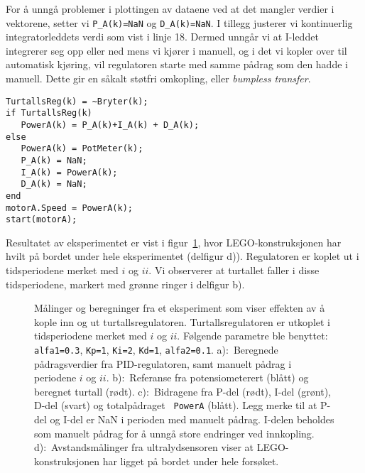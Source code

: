 For å unngå problemer i plottingen av dataene ved at det mangler
verdier i vektorene, setter vi {\tt P\_A(k)=NaN} og {\tt D\_A(k)=NaN}.
I tillegg justerer vi kontinuerlig integratorleddets verdi som vist i
linje 18. Dermed unngår vi at I-leddet integrerer seg opp eller ned mens vi kjører i
manuell, og  i det vi kopler over til automatisk kjøring, vil regulatoren
starte med samme pådrag som den hadde i manuell. Dette gir en såkalt
støtfri omkopling, eller {\it bumpless transfer}. 
\newpage
\begin{lstlisting}[caption=Kode for turtallsregulator for motor A.,
  label=kode:turtall, firstnumber=11]
% trykknapp bestemmer om regulator er i auto eller manuel
TurtallsReg(k) = ~Bryter(k);
if TurtallsReg(k)
   PowerA(k) = P_A(k)+I_A(k) + D_A(k);
else
   PowerA(k) = PotMeter(k);
   P_A(k) = NaN;
   I_A(k) = PowerA(k);
   D_A(k) = NaN;
end
motorA.Speed = PowerA(k);
start(motorA);   
\end{lstlisting}

Resultatet av  eksperimentet er vist i
figur~\ref{fig:auto_man}, hvor LEGO-konstruksjonen har hvilt på bordet
under hele eksperimentet (delfigur d)). Regulatoren er koplet ut
i tidsperiodene merket
med $i$ og $ii$. Vi observerer at turtallet faller i disse
tidsperiodene, markert med grønne ringer i delfigur b).


\begin{figure}[H]
  \centering
  \hspace*{0mm}
  \caption{Målinger og beregninger fra et eksperiment som viser
    effekten av å kople inn og ut
    turtallsregulatoren. Turtallsregulatoren er utkoplet i
    tidsperiodene merket med $i$ og $ii$. Følgende
    parametre ble benyttet: {\tt alfa1=0.3}, {\tt Kp=1}, {\tt Ki=2},
    {\tt Kd=1}, {\tt alfa2=0.1}.
    a):~Beregnede pådragsverdier fra PID-regulatoren, samt manuelt
    pådrag i periodene $i$ og $ii$. 
    b):~Referanse fra potensiometerert (blått) og beregnet
    turtall (rødt). 
    c):~Bidragene fra P-del (rødt), I-del (grønt), D-del (svart) 
    og totalpådraget {\tt
      PowerA} (blått). Legg merke til at P-del og I-del er NaN i
    perioden med manuelt pådrag. I-delen beholdes som manuelt pådrag
    for å unngå store endringer ved innkopling. 
    d):~Avstandsmålinger fra ultralydsensoren viser at LEGO-konstruksjonen har
    ligget på bordet under hele forsøket.} 
  \label{fig:auto_man}
\end{figure}

\newpage

